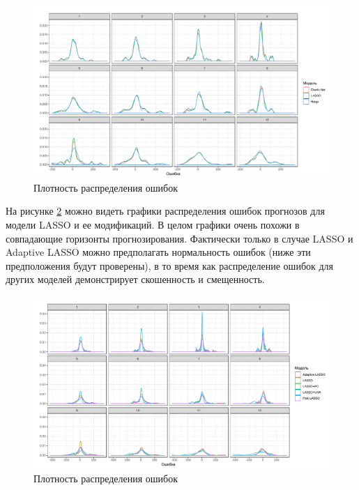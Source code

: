 \begin{figure}[h]
    \centering
    \includegraphics[width = \textwidth]{error1.pdf}
    \caption{Плотность распределения ошибок}
    \label{fig:error1}
\end{figure}
На рисунке \ref{fig:error2} можно видеть графики распределения ошибок прогнозов для модели LASSO и ее модификаций. В целом графики очень похожи в совпадающие горизонты прогнозирования. Фактически только в случае LASSO и Adaptive LASSO можно предполагать нормальность ошибок (ниже эти предположения будут проверены), в то время как распределение ошибок для других моделей демонстрирует скошенность и смещенность.


\begin{figure}[h]
    \centering
    \includegraphics[width = \textwidth]{error2.pdf}
    \caption{Плотность распределения ошибок}
    \label{fig:error2}
\end{figure}


